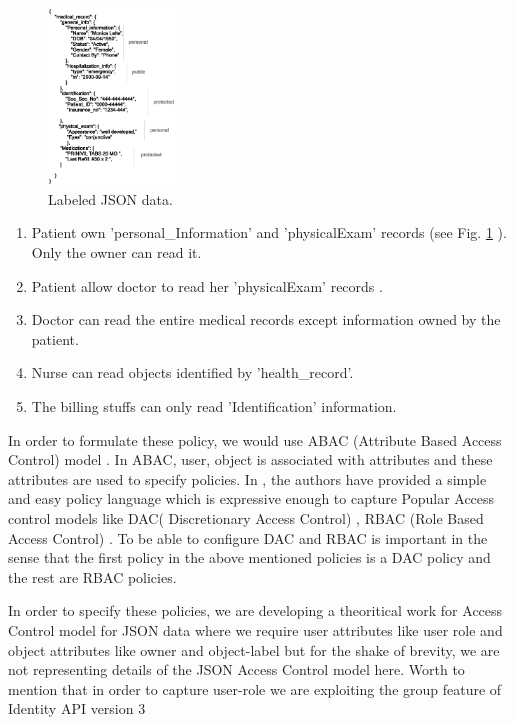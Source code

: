 \begin{figure}[h!]
  \centering
    \includegraphics[width=0.3\textwidth]{eps/json-data}
 \caption{Labeled JSON data.}
\label {fig:patient Record} 
\end{figure}



\begin{enumerate}

  \item   Patient own 'personal\_Information' and 'physicalExam' records (see Fig. \ref{fig:patient Record} ). Only the owner can read it.

\item  Patient allow doctor to read her 'physicalExam' records  .
\item  Doctor can read  the entire medical records except information owned by the patient.  
\item  Nurse can read objects identified by  'health\_record'.  
\item  The billing stuffs can only read 'Identification' information.  
\end{enumerate}

In order to  formulate these policy, we would use ABAC (Attribute Based Access Control) model \cite{abac}. In ABAC, user, object is associated with attributes and these attributes are used to specify policies. In \cite{abac}, the authors have provided a simple and easy policy language which is expressive enough to capture Popular Access control models like  DAC( Discretionary Access Control) \cite{dac}, RBAC (Role Based Access Control) \cite{rbac}. To be able to configure DAC and RBAC is important in the sense that the first policy in the above mentioned policies is a DAC policy and the rest are RBAC policies.

In order to specify these policies, we are developing a theoritical work for Access Control model for JSON data where we require user attributes like user role and object attributes like owner and object-label but for the shake of brevity, we are not representing details of the JSON Access Control model  here. Worth to mention that in order to capture user-role we are exploiting the group feature of Identity API version 3 \cite{identityv3}

